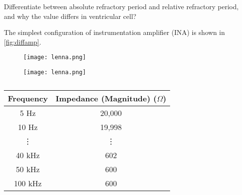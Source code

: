 \documentclass[12pt]{article}
\begin{document}
		
		
		\item Differentiate between absolute refractory period and relative refractory period, and why the value differs in ventricular cell?
		
		
	\listclose 
	
	
	\item The simplest configuration of instrumentation amplifier (INA) is shown in \cref{fig:diffamp}. 
	
	
	\begin{figure}[H] %
		\centering
		\texttt{[image: lenna.png]}		
		\caption{\rajah}
		\label{fig:diffamp2}
	\end{figure}

	\begin{figure}[H] %
		\centering
		\texttt{[image: lenna.png]}
		\caption{\rajah}
		\label{fig:diffamp3}
	\end{figure}

	\begin{table}[H]
		\centering
		\caption{\jadual}	%
		\begin{tabular}{cc}
			\toprule
			\multicolumn{1}{l}{\textbf{Frequency}} & \multicolumn{1}{l}{\textbf{Impedance (Magnitude) ($\Omega$)}} \\
			\midrule
			5 Hz  & 20,000 \\
			10 Hz & 19,998 \\
			\vdots     & \vdots \\
			40 kHz & 602 \\
			50 kHz & 600 \\
			100 kHz & 600 \\
			\bottomrule
		\end{tabular}
		\label{table:freqmag}%
	\end{table}%
\end{document}
